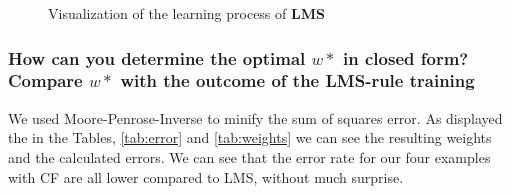 \begin{figure}[!h]
\begin{center}
\centering
{}
\end{center}
\caption{\label{fig:lms} Visualization of the learning process of \textbf{LMS}}
\end{figure}


\subsubsection{How can you determine the optimal $w*$ in closed form?  Compare $w*$ with the outcome of the {LMS}-rule training}
We used Moore-Penrose-Inverse to minify the sum of squares error. As displayed the in the Tables, \ref{tab:error} and \ref{tab:weights} we can see the resulting weights and the calculated errors. We can see that the error rate for our four examples with CF are all lower compared to LMS, without much surprise.

